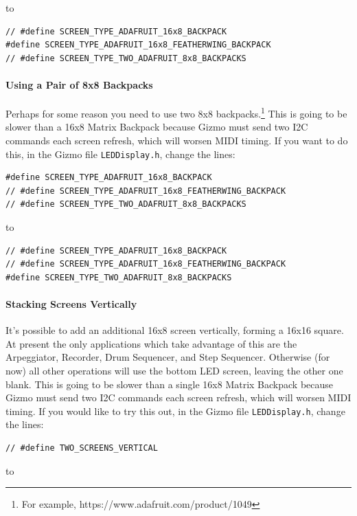 \documentclass{article}
\begin{document}
\begin{enumerate}
to

\begin{verbatim}
// #define SCREEN_TYPE_ADAFRUIT_16x8_BACKPACK
#define SCREEN_TYPE_ADAFRUIT_16x8_FEATHERWING_BACKPACK
// #define SCREEN_TYPE_TWO_ADAFRUIT_8x8_BACKPACKS
\end{verbatim}

\paragraph{Using a Pair of 8x8 Backpacks} Perhaps for some reason you need to use two 8x8 backpacks.\footnote{For example, https:/\!/www.adafruit.com/product/1049} This is going to be slower than a 16x8 Matrix Backpack because Gizmo must send two I2C commands each screen refresh, which will worsen MIDI timing. If you want to do this, in the Gizmo file \texttt{LEDDisplay.h}, change the lines:


\begin{verbatim}
#define SCREEN_TYPE_ADAFRUIT_16x8_BACKPACK
// #define SCREEN_TYPE_ADAFRUIT_16x8_FEATHERWING_BACKPACK
// #define SCREEN_TYPE_TWO_ADAFRUIT_8x8_BACKPACKS
\end{verbatim}

to

\begin{verbatim}
// #define SCREEN_TYPE_ADAFRUIT_16x8_BACKPACK
// #define SCREEN_TYPE_ADAFRUIT_16x8_FEATHERWING_BACKPACK
#define SCREEN_TYPE_TWO_ADAFRUIT_8x8_BACKPACKS
\end{verbatim}

\paragraph{Stacking Screens Vertically} It's possible to add an additional 16x8 screen vertically, forming a 16x16 square.  At present the only applications which take advantage of this are the Arpeggiator, Recorder, Drum Sequencer, and Step Sequencer.  Otherwise (for now) all other operations will use the bottom LED screen, leaving the other one blank. 
This is going to be slower than a single 16x8 Matrix Backpack because Gizmo must send two I2C commands each screen refresh, which will worsen MIDI timing. If you would like to try this out, in the Gizmo file \texttt{LEDDisplay.h}, change the lines:


\begin{verbatim}
// #define TWO_SCREENS_VERTICAL
\end{verbatim}

to


\end{enumerate}
\end{document}
